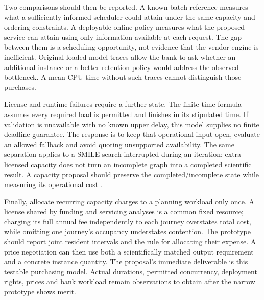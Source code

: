 Two comparisons should then be reported. A known-batch reference measures
what a sufficiently informed scheduler could attain under the same capacity
and ordering constraints. A deployable online policy measures what the
proposed service can attain using only information available at each request.
The gap between them is a scheduling opportunity, not evidence that the vendor
engine is inefficient. Original loaded-model traces allow the bank to ask
whether an additional instance or a better retention policy would address the
observed bottleneck. A mean CPU time without such traces cannot distinguish
those purchases.

License and runtime failures require a further state. The finite time formula
assumes every required load is permitted and finishes in its stipulated time.
If validation is unavailable with no known upper delay, this model supplies
no finite deadline guarantee. The response is to keep that operational input
open, evaluate an allowed fallback and avoid quoting unsupported availability.
The same separation applies to a SMILE search interrupted during an iteration:
extra licensed capacity does not turn an incomplete graph into a completed
scientific result. A capacity proposal should preserve the completed/incomplete
state while measuring its operational cost \citep{exec13_smile_pc}.

Finally, allocate recurring capacity charges to a planning workload only once.
A license shared by funding and servicing analyses is a common fixed resource;
charging its full annual fee independently to each journey overstates total
cost, while omitting one journey's occupancy understates contention. The
prototype should report joint resident intervals and the rule for allocating
their expense. A price negotiation can then use both a scientifically matched
output requirement and a concrete instance quantity. The proposal's immediate
deliverable is this testable purchasing model. Actual durations, permitted
concurrency, deployment rights, prices and bank workload remain observations
to obtain after the narrow prototype shows merit.
